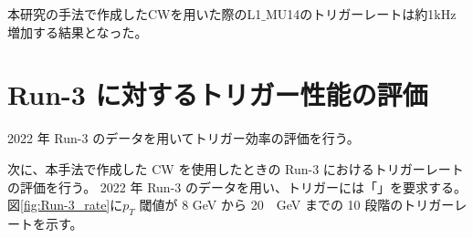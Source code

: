 本研究の手法で作成したCWを用いた際のL1$\_$MU14のトリガーレートは約1kHz増加する結果となった。






\section{Run-3 に対するトリガー性能の評価}
2022 年 Run-3 のデータを用いてトリガー効率の評価を行う。

次に、本手法で作成した CW を使用したときの Run-3 におけるトリガーレートの評価を行う。
2022 年 Run-3 のデータを用い、トリガーには「」を要求する。
図\ref{fig:Run-3_rate}に$p_T$ 閾値が 8 GeV から 20　GeV までの 10 段階のトリガーレートを示す。









